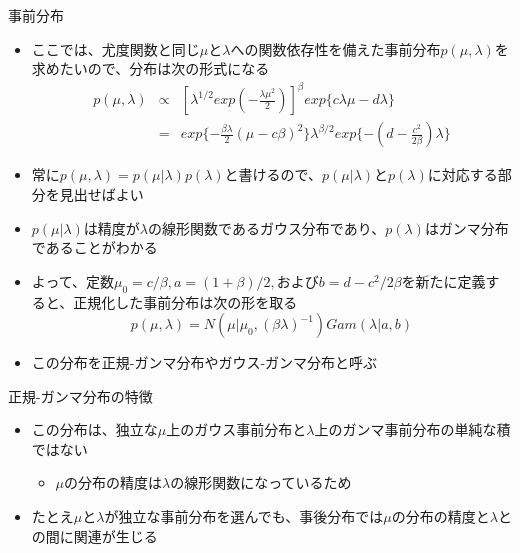 \begin{frame}{事前分布}
 \begin{itemize}
	\item ここでは、尤度関数と同じ$\mu$と$\lambda$への関数依存性を備えた事前分布$p(\mu,\lambda)$を求めたいので、分布は次の形式になる
				\begin{eqnarray}
				 p(\mu,\lambda) &\propto& [\lambda^{1/2}exp(-\frac{\lambda\mu^2}{2})]^\beta exp\{c\lambda\mu-d\lambda\}\\
				 &= & exp\{-\frac{\beta\lambda}{2}(\mu-c\beta)^2\}\lambda^{\beta/2}exp\{-(d-\frac{c^2}{2\beta})\lambda\}
				\end{eqnarray}
	\item 常に$p(\mu,\lambda)=p(\mu|\lambda)p(\lambda)$と書けるので、$p(\mu|\lambda)$と$p(\lambda)$に対応する部分を見出せばよい
	\item $p(\mu|\lambda)$は精度が$\lambda$の線形関数であるガウス分布であり、$p(\lambda)$はガンマ分布であることがわかる
	\item よって、定数$\mu_0=c/\beta, a=(1+\beta)/2,$および$b=d-c^2/2\beta$を新たに定義すると、正規化した事前分布は次の形を取る
				\begin{equation}
				 p(\mu,\lambda)=N(\mu|\mu_0, (\beta\lambda)^{-1})Gam(\lambda|a,b)
				\end{equation}
	\item この分布を正規-ガンマ分布やガウス-ガンマ分布と呼ぶ
 \end{itemize}
\end{frame}

\begin{frame}{正規-ガンマ分布の特徴}
\begin{itemize}
 \item この分布は、独立な$\mu$上のガウス事前分布と$\lambda$上のガンマ事前分布の単純な積ではない
			 \begin{itemize}
				\item $\mu$の分布の精度は$\lambda$の線形関数になっているため
			 \end{itemize}
 \item たとえ$\mu$と$\lambda$が独立な事前分布を選んでも、事後分布では$\mu$の分布の精度と$\lambda$との間に関連が生じる
\end{itemize}
\end{frame}

